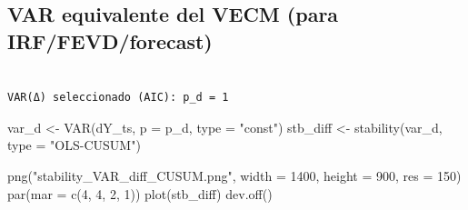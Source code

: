 \documentclass[
  spanish,
  letterpaper,
  DIV=11,
  numbers=noendperiod]{scrartcl}
\newenvironment{Shaded}{\begin{snugshade}}{\end{snugshade}}
\newcommand{\AttributeTok}[1]{\textcolor[rgb]{0.40,0.45,0.13}{#1}}
\newcommand{\DecValTok}[1]{\textcolor[rgb]{0.68,0.00,0.00}{#1}}
\newcommand{\FunctionTok}[1]{\textcolor[rgb]{0.28,0.35,0.67}{#1}}
\newcommand{\NormalTok}[1]{\textcolor[rgb]{0.00,0.23,0.31}{#1}}
\newcommand{\OtherTok}[1]{\textcolor[rgb]{0.00,0.23,0.31}{#1}}
\newcommand{\SpecialCharTok}[1]{\textcolor[rgb]{0.37,0.37,0.37}{#1}}
\newcommand{\StringTok}[1]{\textcolor[rgb]{0.13,0.47,0.30}{#1}}
\begin{document}
\subsection{VAR equivalente del VECM (para
IRF/FEVD/forecast)}\label{var-equivalente-del-vecm-para-irffevdforecast}

\begin{Shaded}
\end{Shaded}

\begin{verbatim}

VAR(Δ) seleccionado (AIC): p_d = 1 
\end{verbatim}

\begin{Shaded}
\begin{Highlighting}[]
\NormalTok{var\_d }\OtherTok{\textless{}{-}} \FunctionTok{VAR}\NormalTok{(dY\_ts, }\AttributeTok{p =}\NormalTok{ p\_d, }\AttributeTok{type =} \StringTok{"const"}\NormalTok{)}
\NormalTok{stb\_diff }\OtherTok{\textless{}{-}} \FunctionTok{stability}\NormalTok{(var\_d, }\AttributeTok{type =} \StringTok{"OLS{-}CUSUM"}\NormalTok{)}
\end{Highlighting}
\end{Shaded}

\begin{Shaded}
\begin{Highlighting}[]
\FunctionTok{png}\NormalTok{(}\StringTok{"stability\_VAR\_diff\_CUSUM.png"}\NormalTok{, }\AttributeTok{width =} \DecValTok{1400}\NormalTok{, }\AttributeTok{height =} \DecValTok{900}\NormalTok{, }\AttributeTok{res =} \DecValTok{150}\NormalTok{)}
\FunctionTok{par}\NormalTok{(}\AttributeTok{mar =} \FunctionTok{c}\NormalTok{(}\DecValTok{4}\NormalTok{, }\DecValTok{4}\NormalTok{, }\DecValTok{2}\NormalTok{, }\DecValTok{1}\NormalTok{))}
\FunctionTok{plot}\NormalTok{(stb\_diff)}
\FunctionTok{dev.off}\NormalTok{()}
\end{Highlighting}
\end{Shaded}
\end{document}
